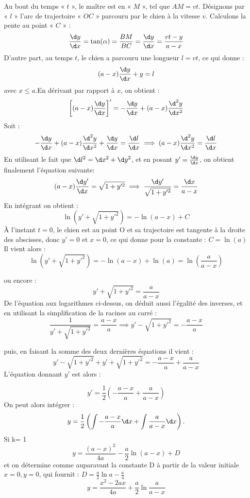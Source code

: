 \begin{Answer}
  Au bout du temps « $t$ », le maître est en  « $M$ », tel que $AM = vt$.
  Désignons par « $l$ » l'arc de trajectoire « $OC$ » parcouru par le chien à la vitesse $v$. Calculons la pente au point « $C$ »  :
\[\frac{\d y}{\d x} = \tan(\alpha)= \frac{BM}{BC} =\frac{\d y}{\d x} = \frac{vt-y}{a-x} \]
D'autre part, au temps $t$, le chien a parcouru une longueur $l = vt$, ce qui donne :
\[(a-x)\frac{\d y}{\d x} +y = l \]
avec $x \leqslant a.$En dérivant par rapport à $x$, on obtient :
\[\left[(a-x)\frac{\d y}{\d x}\right]' = -\frac{\d y}{\d x} + (a-x)\frac{{\d^2} y}{\d x^2}\]
Soit :
\[-\frac{\d y}{\d x} + (a-x)\frac{{\d^2} y}{\d x^2} +  \frac{\d y}{\d x} = \frac{\d l}{\d x} \implies
(a-x)\frac{{\d^2} y}{\d x^2} = \frac{\d l}{\d x}\]
En utilisant le fait que $\d l^2 = \d x^2+\d y^2 $, et en posant $y'=\frac{\d y}{\d x} $, on obtient finalement  l'équation suivante:
\[(a-x)\frac{\d y'}{\d x} = \sqrt{1+y'^2}
\implies \frac{\d y'}{\sqrt{1+y'^2}} = \frac{\d x}{a-x} \]
En intégrant on obtient :
\[\ln (y'+ \sqrt{1+y'^2}) = -\ln(a-x)+C \]
À l'instant $t=0$, le chien est au point O et sa trajectoire est tangente à la droite des abscisses, donc $y'=0$ et $x=0$, ce qui donne pour la constante : $ C = \ln(a)$
Il vient alors :
\[\ln (y'+ \sqrt{1+y'^2}) = -\ln(a-x) + \ln(a) = \ln\left(\frac{a}{a-x}\right) \]

ou encore :
\[y'+ \sqrt{1+y'^2} = \frac{a}{a-x}\]
De l'équation aux logarithmes ci-dessus, on déduit aussi l’égalité des inverses, et en utilisant la simplification de la racines au carré  :
\[
  \frac{1}{y'+\sqrt{1+y'^2}} = \frac{a-x}{a} \implies
  y' - \sqrt{1+y'^2} = -\frac{a-x}{a}
\]

puis, en faisant la somme des deux dernières équations il vient :
\[y'- \sqrt{1+y'^2} + y'+\sqrt{1+y'^2} = -\frac{a-x}{a} + \frac{a}{a-x}\]
L'équation donnant $y'$ est alors :

\[y' = \frac{1}{2} (-\frac{a-x}{a}+\frac{a}{a-x})\]
On peut alors intégrer :
\[ y = \frac{1}{2} \left(\int{-\frac{a-x}{a}}\d x + \int{\frac{a}{a-x}}\d x\right).\]
Si k= 1 \[y=\frac{(a-x)^2}{4a}-\frac{a}{2}\ln (a-x) +D\]
 et on détermine comme auparavant la constante D à partir de la valeur initiale $x=0, y=0$,  qui fournit : $D=\frac{a}{2}\ln a-\frac{a}{4}$
\[y=\frac{x^2-2ax}{4a}+\frac{a}{2}\ln{\frac{a}{a-x}}\]

\end{Answer}
